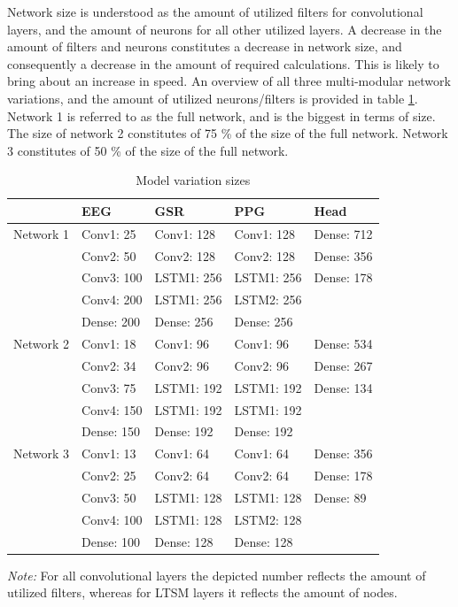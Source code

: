 \documentclass[12pt]{article}
\begin{document}
Network size is understood as the amount of utilized filters for convolutional layers, and the amount of neurons for all other utilized layers. A decrease in the amount of filters and neurons constitutes a decrease in network size, and consequently a decrease in the amount of required calculations. This is likely to bring about an increase in speed. An overview of all three multi-modular network variations, and the amount of utilized neurons/filters is provided in table \ref{table:modelvariations}. Network 1 is referred to as the full network, and is the biggest in terms of size. The size of network 2 constitutes of 75 \% of the size of the full network. Network 3 constitutes of 50 \% of the size of the full network.

\bgroup
\def\arraystretch{1.6}%
\begin{table}[h]
\centering
\caption{Model variation sizes}
\label{table:modelvariations}
\begin{tabular}{lllll}
\hline
        & EEG        & GSR        & PPG        & Head       \\ \hline
Network 1 & Conv1: 25  & Conv1: 128 & Conv1: 128 & Dense: 712 \\
        & Conv2: 50  & Conv2: 128 & Conv2: 128 & Dense: 356 \\
        & Conv3: 100 & LSTM1: 256 & LSTM1: 256 & Dense: 178 \\
        & Conv4: 200 & LSTM1: 256 & LSTM2: 256 &            \\ 
        \vspace{3ex}
        & Dense: 200 & Dense: 256 & Dense: 256 &            \\ \hline
Network 2 & Conv1: 18  & Conv1: 96  & Conv1: 96  & Dense: 534 \\
        & Conv2: 34  & Conv2: 96  & Conv2: 96  & Dense: 267 \\
        & Conv3: 75  & LSTM1: 192 & LSTM1: 192 & Dense: 134 \\
        & Conv4: 150 & LSTM1: 192 & LSTM1: 192 &            \\
        \vspace{3ex}
        & Dense: 150 & Dense: 192 & Dense: 192 &            \\ \hline
Network 3 & Conv1: 13  & Conv1: 64  & Conv1: 64  & Dense: 356 \\
        & Conv2: 25  & Conv2: 64  & Conv2: 64  & Dense: 178 \\
        & Conv3: 50  & LSTM1: 128 & LSTM1: 128 & Dense: 89  \\
        & Conv4: 100 & LSTM1: 128 & LSTM2: 128 &            \\
        & Dense: 100 & Dense: 128 & Dense: 128 &            \\ \hline
\end{tabular}
\vspace{2ex}

\begin{doublespacing}
{\raggedright \textit{Note:} For all convolutional layers the depicted number reflects the amount of utilized filters, whereas for LTSM layers it reflects the amount  of nodes. \par}
\end{doublespacing}
\end{table}
\end{document}
